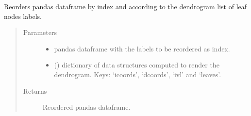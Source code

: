 \documentclass[letterpaper,10pt,english]{sphinxmanual}
\begin{document}
\begin{fulllineitems}
\label{\detokenize{_autosummary/analytics_core.analytics:analytics_core.analytics.wgcnaAnalysis.df_sort_by_dendrogram}}
Reorders pandas dataframe by index and according to the dendrogram list of leaf nodes labels.
\begin{quote}\begin{description}
\item[{Parameters}] \leavevmode\begin{itemize}
\item {} 
 \textendash{} pandas dataframe with the labels to be reordered as index.

\item {} 
 () \textendash{} dictionary of data structures computed to render the dendrogram. Keys: ‘icoords’, ‘dcoords’, ‘ivl’ and ‘leaves’.

\end{itemize}

\item[{Returns}] \leavevmode
Reordered pandas dataframe.

\end{description}\end{quote}

\end{fulllineitems}

\end{document}
